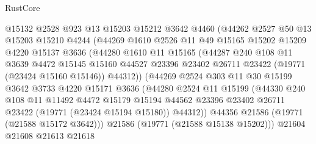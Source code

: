 \begin{lexlean}{RustCore}
\begin{coremodule}
                  @15132
                  @2528
                  @923
                  @13
                  @15203
                  @15212
                  @3642
                  @4460
                  (@44262
                    @2527
                    @50
                    @13
                    @15203
                    @15210
                    @4244
                    (@44269
                      @1610
                      @2526
                      @11
                      @49
                      @15165
                      @15202
                      @15209
                      @4220
                      @15137
                      @3636
                      (@44280
                        @1610
                        @11
                        @15165
                        (@44287
                          @240
                          @108
                          @11
                          @3639
                          @4472
                          @15145
                          @15160
                          @44527
                          @23396
                          @23402
                          @26711
                          @23422
                          (@19771 (@23424 @15160 @15146))
                          @44312))
                      (@44269
                        @2524
                        @303
                        @11
                        @30
                        @15199
                        @3642
                        @3733
                        @4220
                        @15171
                        @3636
                        (@44280
                          @2524
                          @11
                          @15199
                          (@44330
                            @240
                            @108
                            @11
                            @11492
                            @4472
                            @15179
                            @15194
                            @44562
                            @23396
                            @23402
                            @26711
                            @23422
                            (@19771 (@23424 @15194 @15180))
                            @44312))
                        @44356
                        @21586
                        (@19771 (@21588 @15172 @3642)))
                      @21586
                      (@19771 (@21588 @15138 @15202)))
                    @21604
                    @21608
                    @21613
                    @21618

\end{coremodule}
\end{lexlean}

